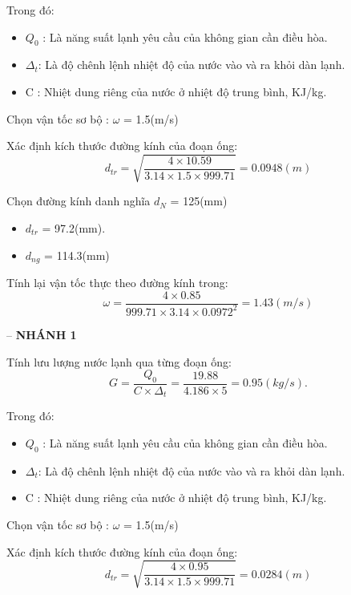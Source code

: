 Trong đó:
\begin{itemize}
	\item $Q_{0}$ : Là năng suất lạnh yêu cầu của không gian cần điều hòa.
	\item $\Delta_{t}$: Là độ chênh lệnh nhiệt độ của nước vào và ra khỏi dàn lạnh.
	\item C : Nhiệt dung riêng của nước ở nhiệt độ trung bình, KJ/kg.
\end{itemize}

Chọn vận tốc sơ bộ : $\omega$ = 1.5(m/s)

Xác định kích thước đường kính của đoạn ống:
\begin{equation*}
	d_{tr} = \sqrt{\dfrac{4 \times 10.59}{3.14 \times 1.5 \times 999.71}} = 0.0948(m)
\end{equation*}

Chọn đường kính danh nghĩa $d_{N}$ = 125(mm)
\begin{itemize}
	\item $d_{tr}$ = 97.2(mm).
	\item $d_{ng}$ = 114.3(mm)
\end{itemize}

Tính lại vận tốc thực theo đường kính trong:
\begin{equation*}
	\omega = \dfrac{4 \times 0.85 }{999.71 \times 3.14 \times 0.0972^{2}} = 1.43(m/s)
\end{equation*}

-- \textbf{NHÁNH 1}

Tính lưu lượng nước lạnh qua từng đoạn ống:
\begin{equation*}
	G = \dfrac{Q_{0}}{C \times \Delta_{t}} =\dfrac{19.88}{4.186 \times 5} = 0.95(kg/s).
\end{equation*}

Trong đó:
\begin{itemize}
	\item $Q_{0}$ : Là năng suất lạnh yêu cầu của không gian cần điều hòa.
	\item $\Delta_{t}$: Là độ chênh lệnh nhiệt độ của nước vào và ra khỏi dàn lạnh.
	\item C : Nhiệt dung riêng của nước ở nhiệt độ trung bình, KJ/kg.
\end{itemize}

Chọn vận tốc sơ bộ : $\omega$ = 1.5(m/s)

Xác định kích thước đường kính của đoạn ống:
\begin{equation*}
	d_{tr} = \sqrt{\dfrac{4 \times 0.95}{3.14 \times 1.5 \times 999.71}} = 0.0284(m)
\end{equation*}


